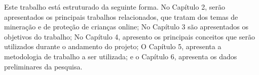 

Este trabalho está estruturado da seguinte forma. No Capítulo 2, serão apresentados os principais trabalhos relacionados, que tratam dos temas de mineração e de proteção de crianças online; No Capítulo 3 são apresentados os objetivos do trabalho; No Capítulo 4, apresento os principais conceitos que serão utilizados durante o andamento do projeto; O Capítulo 5, apresenta a metodologia de trabalho a ser utilizada; e o Capítulo 6, apresenta os dados preliminares da pesquisa.
